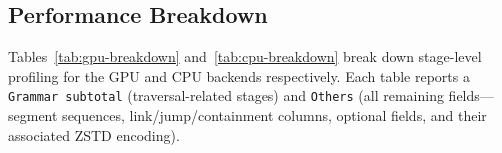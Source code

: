 \begin{table}[t]
  \centering
  \scriptsize
  \setlength{\tabcolsep}{4pt}
  \renewcommand{\arraystretch}{1.05}
  \caption{GPU stage-level profiling for compression and decompression.
    Share is computed as \texttt{time / stage total}.}
  \label{tab:gpu-breakdown}
  \resizebox{\columnwidth}{!}{%
    
  }
\end{table}



\begin{table}[t]
  \centering
  \scriptsize
  \setlength{\tabcolsep}{3pt}
  \renewcommand{\arraystretch}{1.05}
  \caption{CPU peak resident memory using 16 threads for compression, a legacy decompression baseline that fully materializes the in-memory \texttt{GfaGraph}, and the implemented streaming decompression path.}
  \label{tab:cpu-memory}
\end{table}



\subsection{Performance Breakdown}\label{subsec:breakdown}
Tables~\ref{tab:gpu-breakdown} and~\ref{tab:cpu-breakdown} break down stage-level profiling for the GPU and CPU backends respectively. Each table reports a \texttt{Grammar subtotal} (traversal-related stages) and \texttt{Others} (all remaining fields---segment sequences, link/jump/containment columns, optional fields, and their associated ZSTD encoding).

